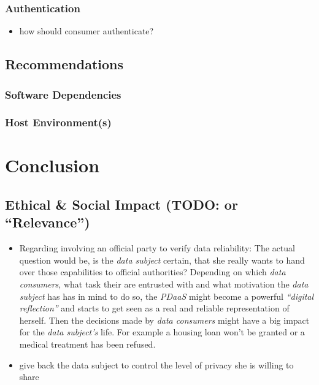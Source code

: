 \documentclass[12pt,english,a4paper,titlepage,cleardoublepage=empty,dottedtoc]{report}
\providecommand{\tightlist}{%
  \setlength{\itemsep}{0pt}\setlength{\parskip}{0pt}}
\begin{document}
\subsection{Authentication}\label{authentication-1}

\begin{itemize}
\tightlist
\item
  how should consumer authenticate?
\end{itemize}

\section{Recommendations}\label{recommendations}

\subsection{Software Dependencies}\label{software-dependencies}

\subsection{Host Environment(s)}\label{host-environments}

\chapter{Conclusion}\label{conclusion}

\section{\texorpdfstring{Ethical \& Social Impact (TODO: or
``Relevance'')}{Ethical \& Social Impact (TODO: or Relevance)}}\label{ethical-social-impact-todo-or-relevance}

\begin{itemize}
\item
  Regarding involving an official party to verify data reliability: The
  actual question would be, is the \emph{data subject} certain, that she
  really wants to hand over those capabilities to official authorities?
  Depending on which \emph{data consumers}, what task their are
  entrusted with and what motivation the \emph{data subject} has has in
  mind to do so, the \emph{PDaaS} might become a powerful
  \emph{``digital reflection''} and starts to get seen as a real and
  reliable representation of herself. Then the decisions made by
  \emph{data consumers} might have a big impact for the \emph{data
  subject's} life. For example a housing loan won't be granted or a
  medical treatment has been refused.
\item
  give back the data subject to control the level of privacy she is
  willing to share
\end{itemize}
\end{document}
